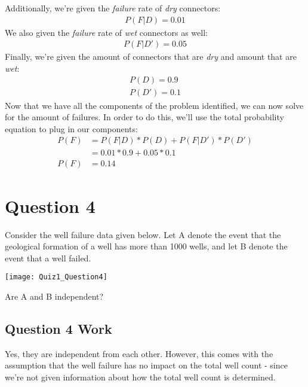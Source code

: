 \documentclass[../INDE315_HW.tex]{subfiles}
\begin{document}
Additionally, we're given the \emph{failure} rate of \emph{dry} connectors:
\begin{equation*}
    \begin{aligned}
        P(F|D) = 0.01
    \end{aligned}
\end{equation*}
We also given the \emph{failure} rate of \emph{wet} connectors as well:
\begin{equation*}
    \begin{aligned}
        P(F|D') = 0.05
    \end{aligned}
\end{equation*}
Finally, we're given the amount of connectors that are \emph{dry} and amount that are \emph{wet}:
\begin{equation*}
    \begin{aligned}
        P(D) = 0.9 \\
        P(D') = 0.1
    \end{aligned}
\end{equation*}
Now that we have all the components of the problem identified, we can now solve for the amount of failures. In order to do this, we'll use the total probability equation to plug in our components:
\begin{equation*}
    \begin{aligned}
        P(F) &= P(F|D) * P(D) + P(F|D') * P(D') \\
        &= 0.01 * 0.9 + 0.05 * 0.1 \\
        P(F) &= 0.14
    \end{aligned}
\end{equation*}

\section*{Question 4}
Consider the well failure data given below. Let A denote the event that the geological formation of a well has more than 1000 wells, and let B denote the event that a well failed.
\begin{center}
    \texttt{[image: Quiz1\_Question4]}
\end{center}
Are A and B independent?

\subsection*{Question 4 Work}
Yes, they are independent from each other. However, this comes with the assumption that the well failure has no impact on the total well count - since we're not given information about how the total well count is determined.
\end{document}
